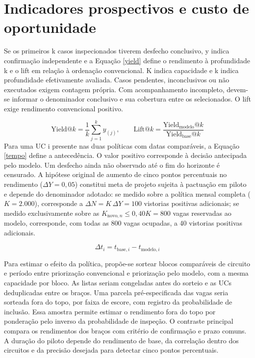 \section{Indicadores prospectivos e custo de oportunidade}
Se os primeiros k casos inspecionados tiverem desfecho conclusivo, y indica confirmação independente e a Equação \eqref{yield} define o rendimento à profundidade k e o lift em relação à ordenação convencional. K indica capacidade e k indica profundidade efetivamente avaliada. Casos pendentes, inconclusivos ou não executados exigem contagem própria. Com acompanhamento incompleto, devem-se informar o denominador conclusivo e sua cobertura entre os selecionados. O lift exige rendimento convencional positivo.

\begin{equation}\label{yield}
\mathrm{Yield}@k=\frac{1}{k}\sum_{j=1}^{k}y_{(j)},\qquad \mathrm{Lift}@k=\frac{\mathrm{Yield}_{\mathrm{modelo}}@k}{\mathrm{Yield}_{\mathrm{base}}@k}
\end{equation}
Para uma UC i presente nas duas políticas com datas comparáveis, a Equação \eqref{tempo} define a antecedência. O valor positivo corresponde à decisão antecipada pelo modelo. Um desfecho ainda não observado até o fim do horizonte é censurado. A hipótese original de aumento de cinco pontos percentuais no rendimento ($\Delta Y = 0{,}05$) constitui meta de projeto sujeita à pactuação em piloto e depende do denominador adotado: se medido sobre a política mensal completa ($K = 2.000$), corresponde a $\Delta N = K\,\Delta Y = 100$ vistorias positivas adicionais; se medido exclusivamente sobre as $K_{\mathrm{novo},n} \le 0{,}40 K = 800$ vagas reservadas ao modelo, corresponde, com todas as 800 vagas ocupadas, a 40 vistorias positivas adicionais.

\begin{equation}\label{tempo}
\Delta t_i=t_{\mathrm{base},i}-t_{\mathrm{modelo},i}
\end{equation}

Para estimar o efeito da política, propõe-se sortear blocos comparáveis de circuito e período entre priorização convencional e priorização pelo modelo, com a mesma capacidade por bloco. As listas seriam congeladas antes do sorteio e as UCs deduplicadas entre os braços. Uma parcela pré-especificada das vagas seria sorteada fora do topo, por faixa de escore, com registro da probabilidade de inclusão. Essa amostra permite estimar o rendimento fora do topo por ponderação pelo inverso da probabilidade de inspeção. O contraste principal compara os rendimentos dos braços com critério de confirmação e prazo comuns. A duração do piloto depende do rendimento de base, da correlação dentro dos circuitos e da precisão desejada para detectar cinco pontos percentuais.

